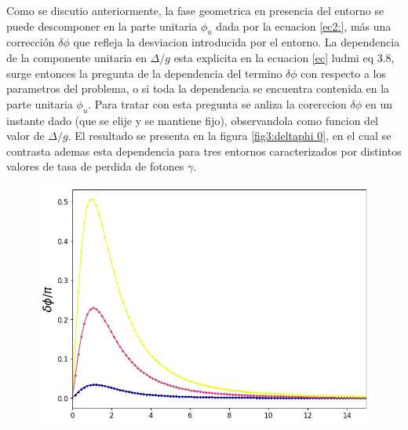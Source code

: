Como se discutio anteriormente, la fase geometrica en presencia del entorno se puede descomponer en la parte unitaria $\phi_u$ dada por la ecuacion \ref{ec2:}, más una corrección $\delta\phi$ que refleja la desviacion introducida por el entorno. La dependencia de la componente unitaria en $\Delta/g$ esta explicita en la ecuacion \ref{ec} ludmi eq 3.8, surge entonces la pregunta de la dependencia del termino $\delta\phi$ con respecto a los parametros del problema, o si toda la dependencia se encuentra contenida en la parte unitaria $\phi_u$. Para tratar con esta pregunta se anliza la corerccion $\delta\phi$ en un instante dado (que se elije y se mantiene fijo), observandola como funcion del valor de $\Delta/g$. El resultado se presenta en la figura \ref{fig3:deltaphi 0}, en el cual se contrasta ademas esta dependencia para tres entornos caracterizados por distintos valores de tasa de perdida de fotones $\gamma$.
\begin{figure}[H]
    \begin{minipage}[c]{0.67\textwidth}
        \includegraphics[width=\textwidth]{figuras/ch3/robustez x=0.png}
    \end{minipage}\hfill
    \begin{minipage}[c]{0.3\textwidth}
    \caption{
         } \label{fig3:robustez 0}
  \end{minipage}
\end{figure}
